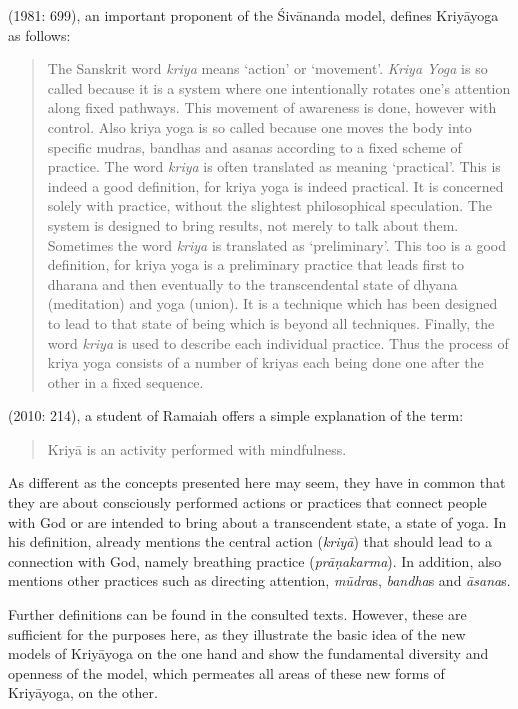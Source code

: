 \citeauthor{kriyayogasarasvati1981} (1981: 699), an important proponent of the Śivānanda model, defines Kriyāyoga as follows: \begin{quote} The Sanskrit word \textit{kriya} means `action' or `movement'. \textit{Kriya Yoga} is so called because it is a system where one intentionally rotates one's attention along fixed pathways. This movement of awareness is done, however with control. Also kriya yoga is so called because one moves the body into specific mudras, bandhas and asanas according to a fixed scheme of practice. The word \textit{kriya} is often translated as meaning `practical'. This is indeed a good definition, for kriya yoga is indeed practical. It is concerned solely with practice, without the slightest philosophical speculation. The system is designed to bring results, not merely to talk about them. Sometimes the word \textit{kriya} is translated as `preliminary'. This too is a good definition, for kriya yoga is a preliminary practice that leads first to dharana and then eventually to the transcendental state of dhyana (meditation) and yoga (union). It is a technique which has been designed to lead to that state of being which is beyond all techniques. Finally, the word \textit{kriya} is used to describe each individual practice. Thus the process of kriya yoga consists of a number of kriyas each being done one after the other in a fixed sequence.\end{quote}
\citeauthor{govindan2010} (2010: 214), a student of Ramaiah offers a simple explanation of the term: \begin{quote} Kriyā is an activity performed with mindfulness.\end{quote}

As different as the concepts presented here may seem, they have in common that they are about consciously performed actions or practices that connect people with God or are intended to bring about a transcendent state, a state of yoga. In his definition, \citeauthor{kriyayoganityananda2013} already mentions the central action (\textit{kriyā}) that should lead to a connection with God, namely breathing practice (\textit{prāṇakarma}). In addition, \citeauthor{kriyayogasarasvati1981} also mentions other practices such as directing attention, \textit{mūdra}s, \textit{bandha}s and \textit{āsana}s.  

Further definitions can be found in the consulted texts. However, these are sufficient for the purposes here, as they illustrate the basic idea of the new models of Kriyāyoga on the one hand and show the fundamental diversity and openness of the model, which permeates all areas of these new forms of Kriyāyoga, on the other.  

